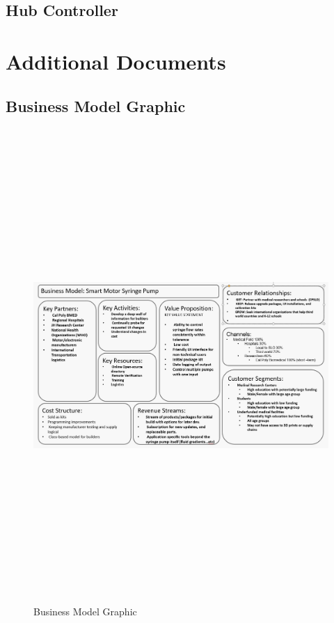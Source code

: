 \documentclass[journal]{IEEEtran}
\begin{document}
    \newpage
    \quad
    \newpage
    

        
    \subsection{Hub Controller}
        
        
\section{Additional Documents}
    \label{Appendix:Documents}
    \subsection{Business Model Graphic}
        \begin{figure}[H]
            \centering
            \includegraphics[width = 22cm, height = 18cm, angle=90]{Images/Business model.jpg}
            \caption{Business Model Graphic}
            \label{fig:business_sheet}
        \end{figure}
        
\end{document}

